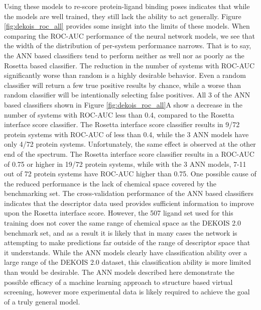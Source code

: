 Using these models to re-score protein-ligand binding poses indicates that while the models are well trained, they still lack the ability to act generally. Figure \ref{fig:dekois_roc_all} provides some insight into the limits of these models.
When comparing the ROC-AUC performance of the neural network models, we see that the width of the distribution of per-system performance narrows.
That is to say, the ANN based classifiers tend to perform neither as well nor as poorly as the Rosetta based classifier.
The reduction in the number of systems with ROC-AUC significantly worse than random is a highly desirable behavior.
Even a random classifier will return a few true positive results by chance, while a worse than random classifier will be intentionally selecting false positives.
All 3 of the ANN based classifiers shown in Figure \ref{fig:dekois_roc_all}A show a decrease in the number of systems with ROC-AUC less than 0.4, compared to the Rosetta interface score classifier.
The Rosetta interface score classifier results in 9/72 protein systems with ROC-AUC of less than 0.4, while the 3 ANN models have only 4/72 protein systems.
Unfortunately, the same effect is observed at the other end of the spectrum.
The Rosetta interface score classifier results in a ROC-AUC of 0.75 or higher in 19/72 protein systems, while with the 3 ANN models, 7-11 out of 72 protein systems have ROC-AUC higher than 0.75. 
One possible cause of the reduced performance is the lack of chemical space covered by the benchmarking set.
The cross-validation performance of the ANN based classifiers indicates that the descriptor data used provides sufficient information to improve upon the Rosetta interface score.
However, the 507 ligand set used for this training does not cover the same range of chemical space as the DEKOIS 2.0 benchmark set, and as a result it is likely that in many cases the network is attempting to make predictions far outside of the range of descriptor space that it understands.
While the ANN models clearly have classification ability over a large range of the DEKOIS 2.0 dataset, this classification ability is more limited than would be desirable.
The ANN models described here demonstrate the possible efficacy of a machine learning approach to structure based virtual screening, however more experimental data is likely required to achieve the goal of a truly general model. 